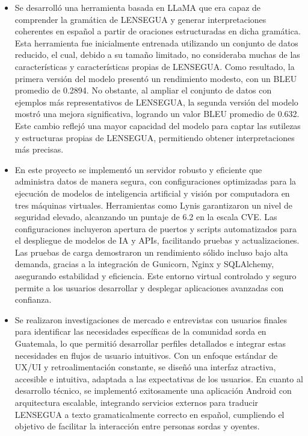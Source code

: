 \begin{itemize}
\item Se desarrolló una herramienta basada en LLaMA que era capaz de comprender la gramática de LENSEGUA y generar interpretaciones coherentes en español a partir de oraciones estructuradas en dicha gramática. Esta herramienta fue inicialmente entrenada utilizando un conjunto de datos reducido, el cual, debido a su tamaño limitado, no consideraba muchas de las características y características propias de LENSEGUA. Como resultado, la primera versión del modelo presentó un rendimiento modesto, con un BLEU promedio de 0.2894. No obstante, al ampliar el conjunto de datos con ejemplos más representativos de LENSEGUA, la segunda versión del modelo mostró una mejora significativa, logrando un valor BLEU promedio de 0.632. Este cambio reflejó una mayor capacidad del modelo para captar las sutilezas y estructuras propias de LENSEGUA, permitiendo obtener interpretaciones más precisas.

\item En este proyecto se implementó un servidor robusto y eficiente que administra datos de manera segura, con configuraciones optimizadas para la ejecución de modelos de inteligencia artificial y visión por computadora en tres máquinas virtuales. Herramientas como Lynis garantizaron un nivel de seguridad elevado, alcanzando un puntaje de 6.2 en la escala CVE. Las configuraciones incluyeron apertura de puertos y scripts automatizados para el despliegue de modelos de IA y APIs, facilitando pruebas y actualizaciones. Las pruebas de carga demostraron un rendimiento sólido incluso bajo alta demanda, gracias a la integración de Gunicorn, Nginx y SQLAlchemy, asegurando estabilidad y eficiencia. Este entorno virtual controlado y seguro permite a los usuarios desarrollar y desplegar aplicaciones avanzadas con confianza.

\item Se realizaron investigaciones de mercado e entrevistas con usuarios finales para identificar las necesidades específicas de la comunidad sorda en Guatemala, lo que permitió desarrollar perfiles detallados e integrar estas necesidades en flujos de usuario intuitivos. Con un enfoque estándar de UX/UI y retroalimentación constante, se diseñó una interfaz atractiva, accesible e intuitiva, adaptada a las expectativas de los usuarios. En cuanto al desarrollo técnico, se implementó exitosamente una aplicación Android con arquitectura escalable, integrando servicios externos para traducir LENSEGUA a texto gramaticalmente correcto en español, cumpliendo el objetivo de facilitar la interacción entre personas sordas y oyentes.

\end{itemize}